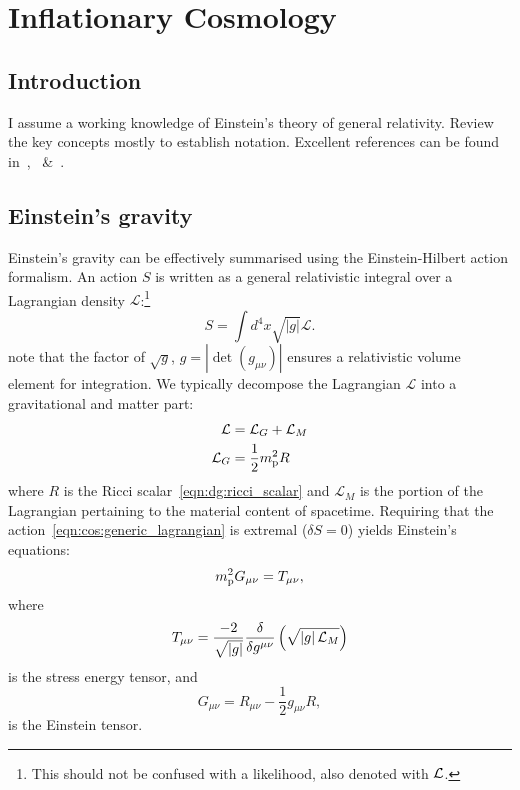 \chapter{Inflationary Cosmology}
\label{chap:cos}

\section{Introduction}
\label{sec:cos:intro}
I assume a working knowledge of Einstein's theory of general relativity. Review the key concepts mostly to establish notation. Excellent references can be found in~\cite{Wald},~\cite{Hobson} \&~\cite{Dodelson}.

\section{Einstein's gravity}
\label{sec:cos:einsteins_gravity}

Einstein's gravity can be effectively summarised using the Einstein-Hilbert action formalism. An action $S$ is written as a general relativistic integral over a Lagrangian density $\mathcal{L}$:\footnote{This should not be confused with a likelihood, also denoted with $\mathcal{L}$.}
\begin{equation}
  S = \int d^4 x \sqrt{|g|} \mathcal{L}.
  \label{eqn:cos:generic_lagrangian}
\end{equation}
note that the factor of $\sqrt{g}$, $g=\left|\det\left( g_{\mu\nu} \right)\right|$ ensures a relativistic volume element for integration.
We typically decompose the Lagrangian $\mathcal{L}$ into a gravitational and matter part:
\begin{align}
  \mathcal{L} &= \mathcal{L}_G + \mathcal{L}_M
  \label{eqn:cos:decomp}\\
  \mathcal{L}_G &= \frac{1}{2} m_{\mathrm{p}}^2 R
  \label{eqn:cos:L_grav}
\end{align}
where $R$ is the Ricci scalar~\eqref{eqn:dg:ricci_scalar} and $\mathcal{L}_M$ is the portion of the Lagrangian pertaining to the material content of spacetime. Requiring that the action~\eqref{eqn:cos:generic_lagrangian} is extremal ($\delta S = 0$) yields Einstein's equations:
\begin{equation}
 m_{\mathrm{p}}^2 G_{\mu\nu} = T_{\mu\nu},
  \label{eqn:cos:einsteins_equations}
\end{equation}
where
\begin{equation}
  T_{\mu\nu} = \frac{-2}{\sqrt{\left|g\right|}}\frac{\delta}{\delta g^{\mu\nu}}\left( \sqrt{\left|g\right| \mathcal{L}_M} \right)
  \label{eqn:cos:SET_fundamantal}
\end{equation}
is the stress energy tensor, and
\begin{equation}
  G_{\mu\nu} = R_{\mu\nu} - \frac{1}{2}g_{\mu\nu} R,
  \label{eqn:cos:einstein_tensor}
\end{equation}
is the Einstein tensor.

